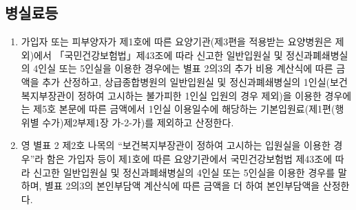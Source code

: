 \clearpage
\subsection{병실료등}
\begin{myshadowbox}
\begin{enumerate}[8.]\tightlist
\item 가입자 또는 피부양자가 제1호에 따른 요양기관(제3편을 적용받는 요양병원은 제외)에서 「국민건강보험법」제43조에 따라 신고한 일반입원실 및 정신과폐쇄병실의 4인실 또는 5인실을 이용한 경우에는 별표 2의3의 추가 비용 계산식에 따른 금액을 추가 산정하고, 상급종합병원의 일반입원실 및 정신과폐쇄병실의 1인실(보건복지부장관이 정하여 고시하는 불가피한 1인실 입원의 경우 제외)을 이용한 경우에는 제5호 본문에 따른 금액에서 1인실 이용일수에 해당하는 기본입원료(제1편(행위별 수가)제2부제1장 가-2-가)를 제외하고 산정한다.
\item 영 별표 2 제2호 나목의 “보건복지부장관이 정하여 고시하는 입원실을 이용한 경우”라 함은 가입자 등이 제1호에 따른 요양기관에서 국민건강보험법 제43조에 따라 신고한 일반입원실 및 정신과폐쇄병실의 4인실 또는 5인실을 이용한 경우를 말하며, 별표 2의3의 본인부담액 계산식에 따른 금액을 더 하여 본인부담액을 산정한다.
\end{enumerate}
\end{myshadowbox}
\prezi{\clearpage}
\prezi{\clearpage}
\par
\medskip
{}
\prezi{\clearpage}
\par
\medskip
{}
\clearpage
